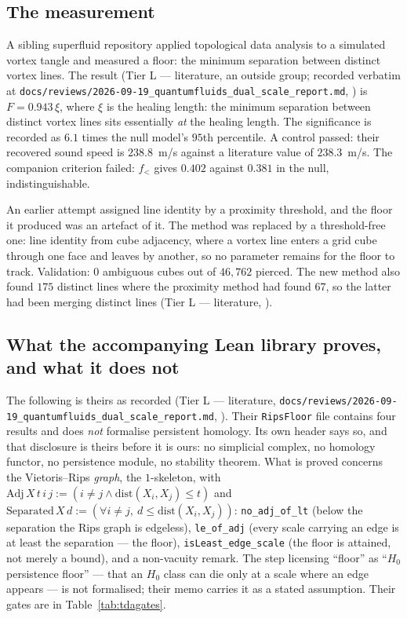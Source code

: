 \documentclass[11pt,a4paper]{article}
\theoremstyle{remark}
\newcommand{\tierL}{\colorbox{blue!10}{\textsf{\scriptsize Tier L --- literature}}}
\newcommand{\lean}[1]{\texttt{#1}}
\begin{document}
\subsection*{The measurement}

A sibling superfluid repository applied topological data analysis to a simulated vortex tangle and measured a floor: the minimum separation between distinct vortex lines. The result (\tierL, an outside group; recorded verbatim at \lean{docs/reviews/2026-09-19\_quantumfluids\_dual\_scale\_report.md}, \cite{QuantumFluids2026}) is $F = 0.943\,\xi$, where $\xi$ is the healing length: the minimum separation between distinct vortex lines sits essentially \emph{at} the healing length. The significance is recorded as $6.1$ times the null model's $95$th percentile. A control passed: their recovered sound speed is $238.8$~m/s against a literature value of $238.3$~m/s. The companion criterion failed: $f_<$ gives $0.402$ against $0.381$ in the null, indistinguishable.

\begin{correctionbox}
An earlier attempt assigned line identity by a proximity threshold, and the floor it produced was an artefact of it. The method was replaced by a threshold-free one: line identity from cube adjacency, where a vortex line enters a grid cube through one face and leaves by another, so no parameter remains for the floor to track. Validation: $0$ ambiguous cubes out of $46{,}762$ pierced. The new method also found $175$ distinct lines where the proximity method had found $67$, so the latter had been merging distinct lines (\tierL, \cite{QuantumFluids2026}).
\end{correctionbox}

\subsection*{What the accompanying Lean library proves, and what it does not}

The following is theirs as recorded (\tierL, \lean{docs/reviews/2026-09-19\_quantumfluids\_dual\_scale\_report.md}, \cite{QuantumFluids2026}). Their \lean{RipsFloor} file contains four results and does \emph{not} formalise persistent homology. Its own header says so, and that disclosure is theirs before it is ours: no simplicial complex, no homology functor, no persistence module, no stability theorem. What is proved concerns the Vietoris--Rips \emph{graph}, the $1$-skeleton, with $\mathrm{Adj}\,X\,t\,i\,j := (i \neq j \wedge \mathrm{dist}(X_i,X_j) \le t)$ and $\mathrm{Separated}\,X\,d := (\forall i \neq j,\ d \le \mathrm{dist}(X_i,X_j))$: \lean{no\_adj\_of\_lt} (below the separation the Rips graph is edgeless), \lean{le\_of\_adj} (every scale carrying an edge is at least the separation --- the floor), \lean{isLeast\_edge\_scale} (the floor is attained, not merely a bound), and a non-vacuity remark. The step licensing ``floor'' as ``$H_0$ persistence floor'' --- that an $H_0$ class can die only at a scale where an edge appears --- is not formalised; their memo carries it as a stated assumption. Their gates are in Table~\ref{tab:tdagates}.
\end{document}
